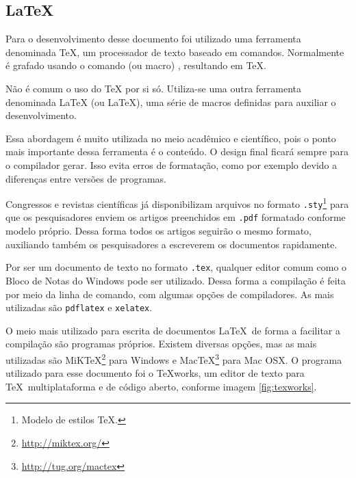 \documentclass[
		12pt,				%
		openright,			%
		oneside,			%
		a4paper,			%
		chapter=TITLE,		%
		english,			%
		brazil				%
	]{abntex2}
\begin{document}
\begin{apendicesenv}

\chapter{LaTeX}\label{ap:latex}

Para o desenvolvimento desse documento foi utilizado uma ferramenta denominada TeX, um processador de texto baseado em comandos. Normalmente é grafado usando o comando (ou macro) \texttt{\detokenize{\TeX}}, resultando em \TeX. 

Não é comum o uso do TeX por si só. Utiliza-se uma outra ferramenta denominada LaTeX (ou \LaTeX), uma série de macros definidas para auxiliar o desenvolvimento.

Essa abordagem é muito utilizada no meio acadêmico e científico, pois o ponto mais importante dessa ferramenta é o conteúdo. O design final ficará sempre para o compilador gerar. Isso evita erros de formatação, como por exemplo devido a diferenças entre versões de programas.

Congressos e revistas científicas já disponibilizam arquivos no formato \texttt{.sty}\footnote{Modelo de estilos \TeX.} para que os pesquisadores enviem os artigos preenchidos em \texttt{.pdf} formatado conforme modelo próprio. Dessa forma todos os artigos seguirão o mesmo formato, auxiliando também os pesquisadores a escreverem os documentos rapidamente.

Por ser um documento de texto no formato \texttt{.tex}, qualquer editor comum como o Bloco de Notas do Windows pode ser utilizado. Dessa forma a compilação é feita por meio da linha de comando, com algumas opções de compiladores. As mais utilizadas são \texttt{pdflatex} e \texttt{xelatex}.

O meio mais utilizado para escrita de documentos \LaTeX\ de forma a facilitar a compilação são programas próprios. Existem diversas opções, mas as mais utilizadas são MiKTeX\footnote{\url{http://miktex.org/}} para Windows e MacTeX\footnote{\url{http://tug.org/mactex}} para Mac OSX. O programa utilizado para esse documento foi o TeXworks, um editor de texto para \TeX\ multiplataforma e de código aberto, conforme imagem \ref{fig:texworks}.


\end{apendicesenv}
\end{document}
